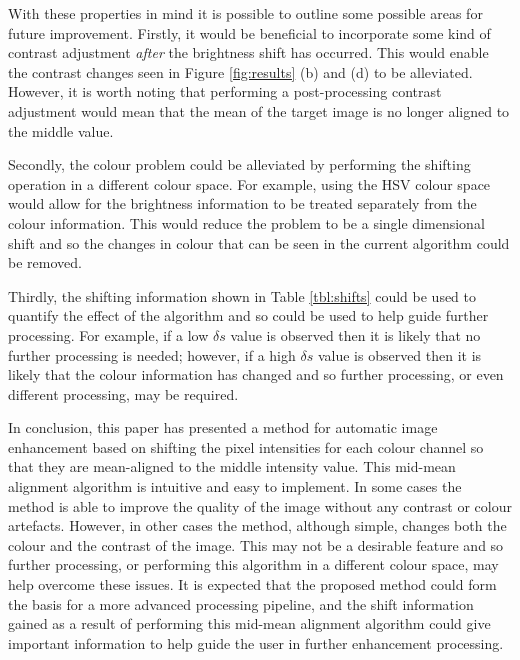 \documentclass[journal,transmag]{IEEEtran}
\begin{document}
With these properties in mind it is possible to outline some possible areas for future improvement.  Firstly, it would be beneficial to incorporate some kind of contrast adjustment \emph{after} the brightness shift has occurred.  This would enable the contrast changes seen in Figure \ref{fig:results} (b) and (d) to be alleviated.  However, it is worth noting that performing a post-processing contrast adjustment would mean that the mean of the target image is no longer aligned to the middle value.

Secondly, the colour problem could be alleviated by performing the shifting operation in a different colour space.  For example, using the HSV colour space would allow for the brightness information to be treated separately from the colour information.  This would reduce the problem to be a single dimensional shift and so the changes in colour that can be seen in the current algorithm could be removed.

Thirdly, the shifting information shown in Table \ref{tbl:shifts} could be used to quantify the effect of the algorithm and so could be used to help guide further processing.  For example, if a low $\delta s$ value is observed then it is likely that no further processing is needed; however, if a high $\delta s$ value is observed then it is likely that the colour information has changed and so further processing, or even different processing, may be required.

In conclusion, this paper has presented a method for automatic image enhancement based on shifting the pixel intensities for each colour channel so that they are mean-aligned to the middle intensity value.  This mid-mean alignment algorithm is intuitive and easy to implement.  In some cases the method is able to improve the quality of the image without any contrast or colour artefacts.  However, in other cases the method, although simple, changes both the colour and the contrast of the image.  This may not be a desirable feature and so further processing, or performing this algorithm in a different colour space, may help overcome these issues.  It is expected that the proposed method could form the basis for a more advanced processing pipeline, and the shift information gained as a result of performing this mid-mean alignment algorithm could give important information to help guide the user in further enhancement processing.





\end{document}
